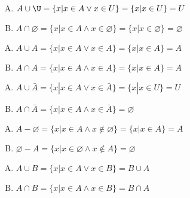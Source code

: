 {{        %
        \begin{practices}
            \begin{enumerate}[A.]
                \item $A \cup \U = \{x | x \in A \vee x \in U\} = \{x | x \in U\} = U$
                \item $A \cap \varnothing = \{x | x \in A \wedge x \in \varnothing\} = \{x | x \in \varnothing\} = \varnothing$
            \end{enumerate}
        \end{practices}

        \begin{practices}
            \begin{enumerate}[A.]
                \item $A \cup A = \{x | x \in A \vee x \in A\} = \{x | x \in A\} = A$
                \item $A \cap A = \{x | x \in A \wedge x \in A\} = \{x | x \in A\} = A$
            \end{enumerate}
        \end{practices}

        \begin{practices}
            \begin{enumerate}[A.]
                \item $A \cup \bar{A} = \{x | x \in A \vee x \in \bar{A}\} = \{x | x \in U\} = U$
                \item $A \cap \bar{A} = \{x | x \in A \wedge x \in \bar{A}\} = \varnothing$
            \end{enumerate}
        \end{practices}

        \begin{practices}
            \begin{enumerate}[A.]
                \item $A - \varnothing = \{x | x \in A \wedge x \notin \varnothing\} = \{x | x \in A\} = A$
                \item $\varnothing - A = \{x | x \in \varnothing \wedge x \notin A\} = \varnothing$
            \end{enumerate}
        \end{practices}

        \begin{practices}
            \begin{enumerate}[A.]
                \item $A \cup B = \{x | x \in A \vee x \in B\} = B \cup A$
                \item $A \cap B = \{x | x \in A \wedge x \in B\} = B \cap A$
            \end{enumerate}
        \end{practices}

}}

